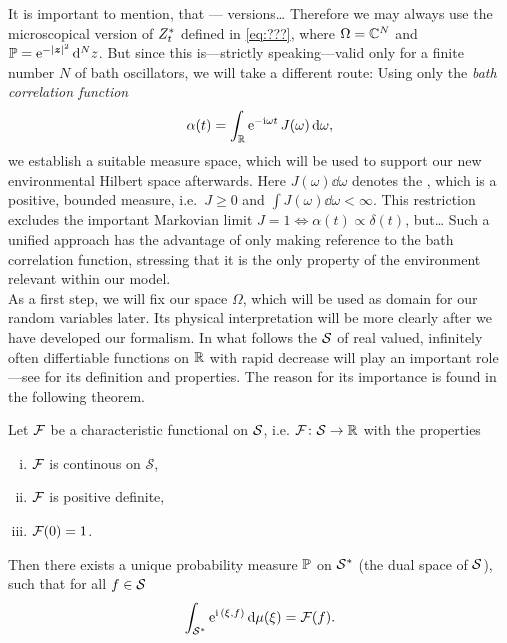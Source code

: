 It is important to mention, that --- versions\dots
Therefore we may always use the microscopical version of ${Z}^*_t$ defined in \autoref{eq:???}, where $\Omega=\mathbb{C}^N$ and $\PM=\exp[-\abs\zz^2]\dd^Nz$.
But since this is---strictly speaking---valid only for a finite number $N$ of bath oscillators, we will take a different route:
Using only the \emph{bath correlation function}
\begin{equation}
  \alpha(t) = \int_\Reals \exp[-\ii\omega t] \, J(\omega)\dd\omega,
  \label{eq:math.def_alpha}
\end{equation}
we establish a suitable measure space, which will be used to support our new environmental Hilbert space afterwards.
Here $J(\omega)\dd\omega$ denotes the , which is a positive, bounded measure, i.e.~$J\ge0$ and $\int J(\omega)\dd\omega < \infty$.
This restriction excludes the important Markovian limit $J=1 \iff \alpha(t)\propto\delta(t)$, but\dots
Such a unified approach has the advantage of only making reference to the bath correlation function, stressing that it is the only property of the environment relevant within our model.\\


As a first step, we will fix our space $\Omega$, which will be used as domain for our random variables later.
Its physical interpretation will be more clearly after we have developed our formalism.
In what follows the  $\mathcal{S}$ of real valued, infinitely often differtiable functions on $\mathbb{R}$ with rapid decrease will play an important role---see \cite[184-188]{Ru91_functional_analysis} for its definition and properties.
The reason for its importance is found in the following theorem.
\begin{thm}
  \label{thm:math.minlos}
  Let $\mathcal{F}$ be a characteristic functional on $\mathcal{S}$, i.e. $\mathcal{F}\colon \mathcal{S} \rightarrow \mathbb{R}$ with the properties
  \begin{enumerate}[i)]
    \item $\mathcal{F}$ is continous on $\mathcal{S}$,
    \item $\mathcal{F}$ is positive definite,
    \item $\mathcal{F}(0) = 1$.
  \end{enumerate}
  Then there exists a unique probability measure $\mathbb{P}$ on ${\mathcal{S}}^*$ (the dual space of $\mathcal{S}$), such that for all $f \in\mathcal{S}$
  \begin{equation}
    \int_{\dual{\SchwartzS}} \exp[\ii \, \dualp{\xi}{f}] \dd\mu(\xi) = \CHF(f).
    \label{eq:math.fourier_minlos}
  \end{equation}
\end{thm}

